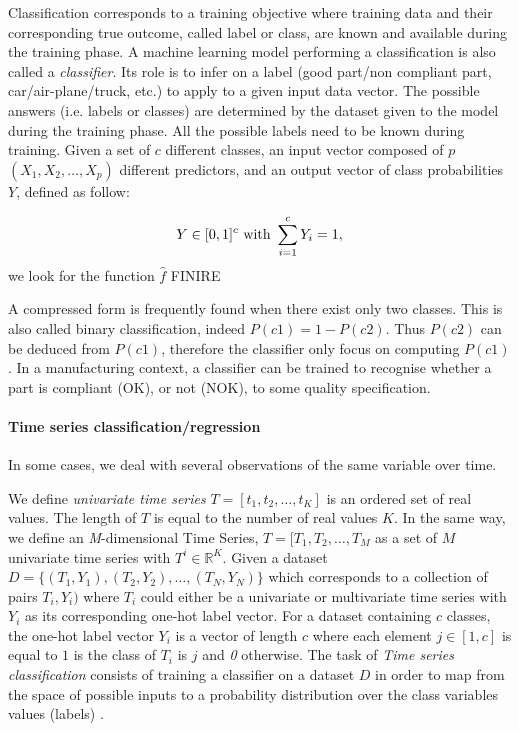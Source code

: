 Classification corresponds to a training objective where training data and their corresponding
true outcome, called label or class, are known and available during the training phase. A machine learning model performing a classification is also called a \textit{classifier}. Its role is to infer on a label (good part/non compliant part, car/air-plane/truck, etc.) to apply to a given input data vector. The possible answers (i.e. labels or classes) are determined by the dataset given to the model during the training phase. All the possible labels need to be known during training. Given a set of $c$ different classes, an input vector composed of $p$ $(X_1,X_2,\ldots,X_p)$ different predictors, and an output vector of class probabilities $Y$, defined as follow:

\begin{equation}
    Y \in [0, 1]^{c} \textnormal{ with } \sum_{i=1}^{c} Y_{i} = 1,
\end{equation}
we look for the function $\hat{f}$ FINIRE

A compressed form is frequently found when there exist only two classes. This is also called binary classification, indeed $P(c1) = 1 - P(c2)$. Thus $P(c2)$ can be deduced from $P(c1)$, therefore the classifier only focus on computing $P(c1)$. In a manufacturing context, a classifier can be trained to recognise whether a part is compliant (OK), or not (NOK), to some quality specification.   

\paragraph{Time series classification/regression}

In some cases, we deal with several observations of the same variable over time. 

We define \textit{univariate time series} $T = [t_{1}, t_{2}, \dots, t_{K}]$ is an ordered set of real values. The length of $T$ is equal to the number of real values $K$. In the same way, we define an \textit{M}-dimensional Time Series, $T = [T_{1}, T_{2}, \dots, T_{M}$ as a set of $M$ univariate time series with $T^{i} \in \mathbb{R}^{K}$. Given a dataset $D = \{(T_{1}, Y_{1}),(T_{2}, Y_{2}),\dots,(T_{N}, Y_{N})\}$ which corresponds to a collection of pairs $T_{i}, Y_{i})$ where $T_i$ could either be a univariate or multivariate time series with $Y_{i}$ as its corresponding one-hot label vector. For a dataset containing $c$ classes, the one-hot label vector $Y_{i}$ is a vector of length $c$ where each element $j \in [1, c]$ is equal to $1$ is the class of $T_{i}$  is $j$ and \textit{0} otherwise. The task of \textit{Time series classification} consists of training a classifier on a dataset $D$ in order to map from the space of possible inputs to a probability distribution over the class variables values (labels) \citep{fawaz2019deep}. 



